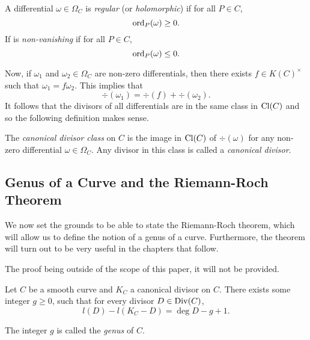 \begin{definition}
	A differential $\omega \in \Omega_C$ is \emph{regular} (or \emph{holomorphic})
	if for all $P \in C$,
	\begin{equation*}
		\operatorname{ord}_P(\omega) \geq 0.
	\end{equation*}
	If is \emph{non-vanishing} if for all $P \in C$,
	\begin{equation*}
		\operatorname{ord}_P(\omega) \leq 0.
	\end{equation*}
\end{definition}

Now, if $\omega_1$ and $\omega_2 \in \Omega_C$ are non-zero differentials, then
there exists $f\in K(C)^\times$ such that $\omega_1 = f\omega_2$.
This implies that
\begin{equation*}
	\div(\omega_1) = \div(f) + \div(\omega_2).
\end{equation*}
It follows that the divisors of all differentials are in the same class in
$\operatorname{Cl}(C)$ and so the following definition makes sense.

\begin{definition}
	The \emph{canonical divisor class} on $C$ is the image in $\operatorname{Cl}(C)$ of
	$\div(\omega)$ for any non-zero differential $\omega \in \Omega_C$.
	Any divisor in this class is called a \emph{canonical divisor}.
\end{definition}

\subsection{Genus of a Curve and the Riemann-Roch Theorem}

We now set the grounds to be able to state the Riemann-Roch theorem, which will
allow us to define the notion of a genus of a curve. Furthermore, the theorem
will turn out to be very useful in the chapters that follow.

The proof being outside of the scope of this paper, it will not be provided.
\begin{theorem}
	\label{thm:riemann-roch}
	Let $C$ be a smooth curve and $K_C$ a canonical divisor on $C$.
	There exists some integer $g \geq 0$, such that for every divisor
	$D \in \operatorname{Div}(C)$,
	\begin{equation*}
		l(D) - l(K_C - D) = \deg D - g + 1.
	\end{equation*}
\end{theorem}

\begin{definition}
	The integer $g$ is called the \emph{genus} of $C$.
\end{definition}

